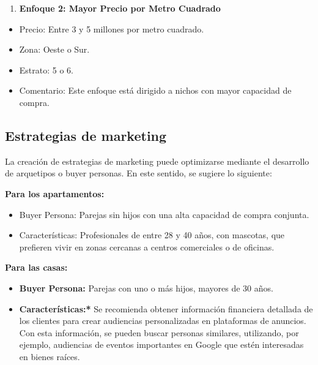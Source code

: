 \documentclass[conference,final,]{IEEEtran}
\providecommand{\tightlist}{%
  \setlength{\itemsep}{0pt}\setlength{\parskip}{0pt}}
\begin{document}
\begin{enumerate}
\def\labelenumi{\arabic{enumi}.}
\setcounter{enumi}{1}
\tightlist
\item
  \textbf{Enfoque 2: Mayor Precio por Metro Cuadrado}
\end{enumerate}

\begin{itemize}
\tightlist
\item
  Precio: Entre 3 y 5 millones por metro cuadrado.
\item
  Zona: Oeste o Sur.
\item
  Estrato: 5 o 6.
\item
  Comentario: Este enfoque está dirigido a nichos con mayor capacidad de
  compra.
\end{itemize}

\subsection{\textbf{Estrategias de marketing}}

La creación de estrategias de marketing puede optimizarse mediante el
desarrollo de arquetipos o buyer personas. En este sentido, se sugiere
lo siguiente:

\textbf{Para los apartamentos:}

\begin{itemize}
\tightlist
\item
  Buyer Persona: Parejas sin hijos con una alta capacidad de compra
  conjunta.
\item
  Características: Profesionales de entre 28 y 40 años, con mascotas,
  que prefieren vivir en zonas cercanas a centros comerciales o de
  oficinas.
\end{itemize}

\textbf{Para las casas:}

\begin{itemize}
\tightlist
\item
  \textbf{Buyer Persona:} Parejas con uno o más hijos, mayores de 30
  años.
\item
  \textbf{Características:* }Se recomienda obtener información
  financiera detallada de los clientes para crear audiencias
  personalizadas en plataformas de anuncios. Con esta información, se
  pueden buscar personas similares, utilizando, por ejemplo, audiencias
  de eventos importantes en Google que estén interesadas en bienes
  raíces.\\
\end{itemize}
\end{document}
